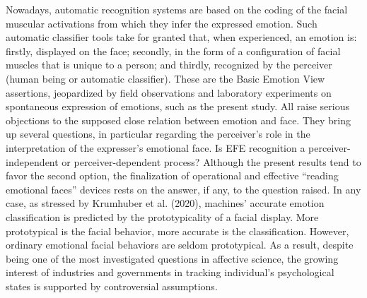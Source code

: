 \documentclass[
  english,
  man]{apa7}
\begin{document}
Nowadays, automatic recognition systems are based on the coding of the facial muscular activations from which they infer the expressed emotion. Such automatic classifier tools take for granted that, when experienced, an emotion is: firstly, displayed on the face; secondly, in the form of a configuration of facial muscles that is unique to a person; and thirdly, recognized by the perceiver (human being or automatic classifier). These are the Basic Emotion View assertions, jeopardized by field observations and laboratory experiments on spontaneous expression of emotions, such as the present study. All raise serious objections to the supposed close relation between emotion and face. They bring up several questions, in particular regarding the perceiver's role in the interpretation of the expresser's emotional face. Is EFE recognition a perceiver-independent or perceiver-dependent process? Although the present results tend to favor the second option, the finalization of operational and effective ``reading emotional faces'' devices rests on the answer, if any, to the question raised. In any case, as stressed by Krumhuber et al. (2020), machines' accurate emotion classification is predicted by the prototypicality of a facial display. More prototypical is the facial behavior, more accurate is the classification. However, ordinary emotional facial behaviors are seldom prototypical. As a result, despite being one of the most investigated questions in affective science, the growing interest of industries and governments in tracking individual's psychological states is supported by controversial assumptions.
\end{document}
